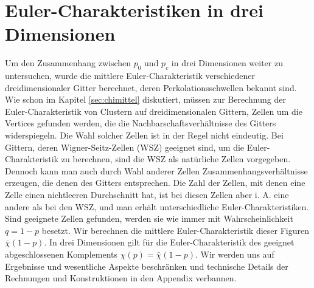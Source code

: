 \section{Euler-Charakteristiken in drei Dimensionen}
Um den Zusammenhang zwischen $p_0$ und $p_c$ in drei Dimensionen weiter zu untersuchen, wurde die mittlere Euler-Charakteristik verschiedener dreidimensionaler Gitter berechnet, deren Perkolationsschwellen bekannt sind. Wie schon im Kapitel \ref{sec:chimittel} diskutiert, m\"ussen zur Berechnung der Euler-Charakteristik von Clustern auf dreidimensionalen Gittern, Zellen um die Vertices gefunden werden, die die Nachbarschaftsverh\"altnisse des Gitters widerspiegeln. Die Wahl solcher Zellen ist in der Regel nicht eindeutig. Bei Gittern, deren Wigner-Seitz-Zellen (WSZ) geeignet sind, um die Euler-Charakteristik zu berechnen, sind die WSZ als nat\"urliche Zellen vorgegeben. Dennoch kann man auch durch Wahl anderer Zellen Zusammenhangsverh\"altnisse erzeugen, die denen des Gitters entsprechen. Die Zahl der Zellen, mit denen eine Zelle einen nichtleeren Durchschnitt hat, ist bei diesen Zellen aber i. A. eine andere als bei den WSZ, und man erh\"alt unterschiedliche Euler-Charakteristiken. 
\\Sind geeignete Zellen gefunden, werden sie wie immer mit Wahrscheinlichkeit $q=1-p$ besetzt. Wir berechnen die mittlere Euler-Charakteristik dieser Figuren $\bar{\chi}(1-p)$. In drei Dimensionen gilt f\"ur die Euler-Charakteristik des geeignet abgeschlossenen Komplements $\chi(p)=\bar{\chi}(1-p)$. Wir werden uns auf Ergebnisse und wesentliche Aspekte beschr\"anken und technische Details der Rechnungen und Konstruktionen in den Appendix verbannen.

